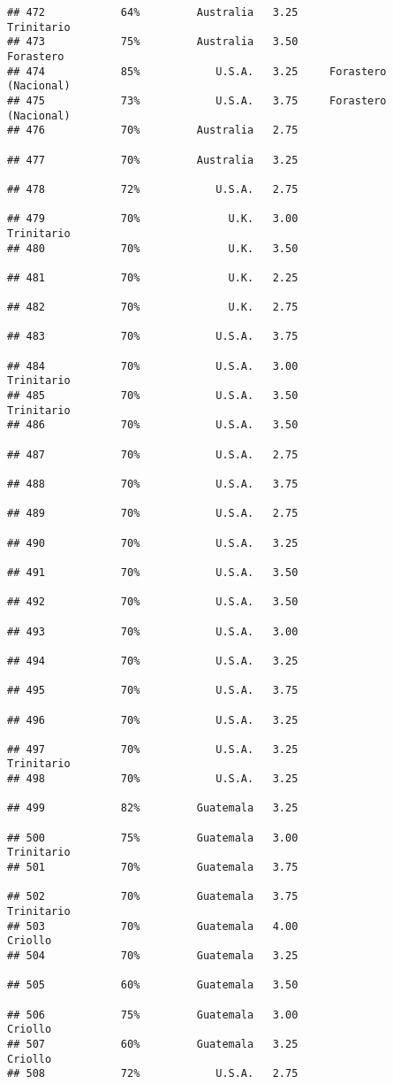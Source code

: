 \documentclass[
]{article}
\begin{document}
\begin{verbatim}
## 472            64%         Australia   3.25               Trinitario
## 473            75%         Australia   3.50                Forastero
## 474            85%            U.S.A.   3.25     Forastero (Nacional)
## 475            73%            U.S.A.   3.75     Forastero (Nacional)
## 476            70%         Australia   2.75                         
## 477            70%         Australia   3.25                         
## 478            72%            U.S.A.   2.75                         
## 479            70%              U.K.   3.00               Trinitario
## 480            70%              U.K.   3.50                         
## 481            70%              U.K.   2.25                         
## 482            70%              U.K.   2.75                         
## 483            70%            U.S.A.   3.75                         
## 484            70%            U.S.A.   3.00               Trinitario
## 485            70%            U.S.A.   3.50               Trinitario
## 486            70%            U.S.A.   3.50                         
## 487            70%            U.S.A.   2.75                         
## 488            70%            U.S.A.   3.75                         
## 489            70%            U.S.A.   2.75                         
## 490            70%            U.S.A.   3.25                         
## 491            70%            U.S.A.   3.50                         
## 492            70%            U.S.A.   3.50                         
## 493            70%            U.S.A.   3.00                         
## 494            70%            U.S.A.   3.25                         
## 495            70%            U.S.A.   3.75                         
## 496            70%            U.S.A.   3.25                         
## 497            70%            U.S.A.   3.25               Trinitario
## 498            70%            U.S.A.   3.25                         
## 499            82%         Guatemala   3.25                         
## 500            75%         Guatemala   3.00               Trinitario
## 501            70%         Guatemala   3.75                         
## 502            70%         Guatemala   3.75               Trinitario
## 503            70%         Guatemala   4.00                  Criollo
## 504            70%         Guatemala   3.25                         
## 505            60%         Guatemala   3.50                         
## 506            75%         Guatemala   3.00                  Criollo
## 507            60%         Guatemala   3.25                  Criollo
## 508            72%            U.S.A.   2.75                         

\end{verbatim}
\end{document}
